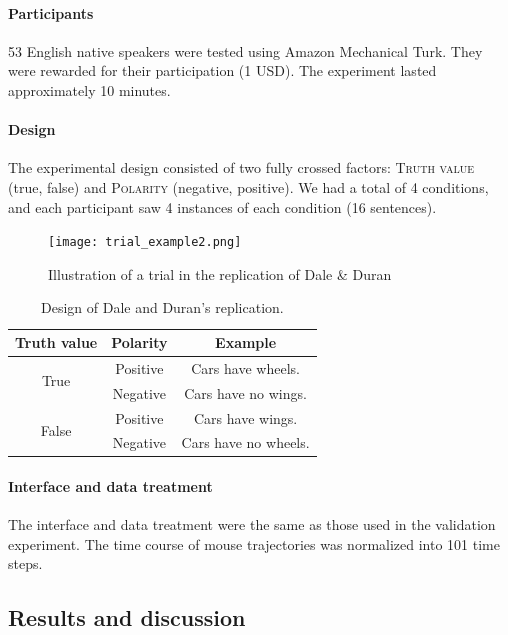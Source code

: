 \documentclass[draft]{article}
\begin{document}
\paragraph{Participants}
53 English native speakers were tested using Amazon Mechanical Turk. They were rewarded for their participation (1 USD). The experiment lasted approximately 10 minutes. 

\paragraph{Design}
The experimental design consisted of two fully crossed factors: \textsc{Truth value} (true, false) and \textsc{Polarity} (negative, positive). We had a total of 4 conditions, and each participant saw 4 instances of each condition (16 sentences). 


\begin{figure}
\centering
\texttt{[image: trial\_example2.png]}
\caption{Illustration of a trial in the replication of Dale \& Duran}
\end{figure}



\begin{table}[h]
\centering
\begin{tabular}{ccc}
Truth value & Polarity & Example \\
\hline
\multirow{2}{*}{True} & Positive & Cars have wheels.\\ 
 & Negative & Cars have no wings.\\ 
\hline
\multirow{2}{*}{False} & Positive & Cars have wings.\\ 
 & Negative & Cars have no wheels.\\
\end{tabular}
\caption{Design of Dale and Duran's replication.} \label{table:exampleDD}
\end{table}


\paragraph{Interface and data treatment}
The interface and data treatment were the same as those used in the validation experiment. The time course of mouse trajectories was normalized into 101 time steps.

\subsection{Results and discussion}
\end{document}
